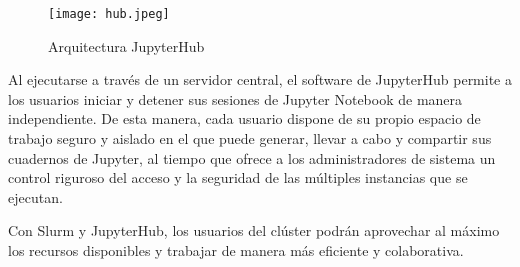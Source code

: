 \begin{spacing}{1.5}
  \begin{figure}[h]
    \centering
    \texttt{[image: hub.jpeg]}
    \caption{Arquitectura JupyterHub \cite{fig5}}
    \label{fig:etiqueta}
  \end{figure}

  Al ejecutarse a través de un servidor central, el software de JupyterHub permite a los usuarios iniciar y detener sus sesiones de Jupyter Notebook de manera independiente. De esta manera, cada usuario dispone de su propio espacio de trabajo seguro y aislado en el que puede generar, llevar a cabo y compartir sus cuadernos de Jupyter, al tiempo que ofrece a los administradores de sistema un control riguroso del acceso y la seguridad de las múltiples instancias que se ejecutan.

  Con Slurm y JupyterHub, los usuarios del clúster podrán aprovechar al máximo los recursos disponibles y trabajar de manera más eficiente y colaborativa.
  \begin{tightcenter}
  \end{tightcenter}
\end{spacing}